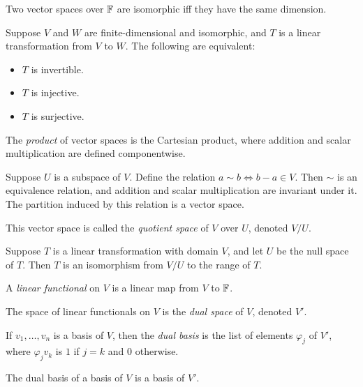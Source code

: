 \begin{prop}
  Two vector spaces over $\mathbb{F}$ are isomorphic iff they have
  the same dimension.
\end{prop}
\begin{prop}
  Suppose $V$ and $W$ are finite-dimensional and isomorphic,
  and $T$ is a linear transformation from $V$
  to $W$. The following are equivalent:
  \begin{itemize}
    \item $T$ is invertible.
    \item $T$ is injective.
    \item $T$ is surjective.
  \end{itemize}
\end{prop}
\begin{defn}
  The \emph{product} of vector spaces is the Cartesian product, where addition
  and scalar multiplication are defined componentwise.
\end{defn}
\begin{prop}
  Suppose $U$ is a subspace of $V$. Define the relation $a\sim b\iff b-a\in V$.
  Then $\sim$ is an equivalence relation, and addition and scalar multiplication
  are invariant under it. The partition induced by this relation is a vector
  space.
\end{prop}
\begin{defn}
  This vector space is called the \emph{quotient space} of $V$ over $U$, denoted
  $V/U$.
\end{defn}
\begin{prop}
  Suppose $T$ is a linear transformation with domain $V$, and let $U$ be the null space of $T$.
  Then $T$ is an isomorphism from $V/U$ to the range of $T$.
\end{prop}
\begin{defn}
  A \emph{linear functional} on $V$ is a linear map from $V$ to $\mathbb{F}$.
\end{defn}
\begin{defn}
  The space of linear functionals on $V$ is the \emph{dual space} of $V$,
  denoted $V'$.
\end{defn}
\begin{defn}
  If $v_1,\ldots,v_n$ is a basis of $V$, then the \emph{dual basis} is the list
  of
  elements $\varphi_j$ of $V'$, where $\varphi_j v_k$ is $1$ if $j=k$ and $0$
  otherwise.
\end{defn}
\begin{prop}
  The dual basis of a basis of $V$ is a basis of $V'$.
\end{prop}

